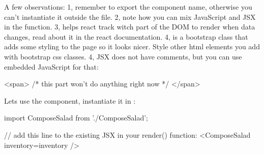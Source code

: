 \documentclass[fleqn, article, a4paper]{memoir}
\begin{document}
\begin{Assignments}
\noindent A few observations: 1, remember to export the component name, otherwise you can't instantiate it outside the file. 2, note how you can mix JavaScript and JSX in the  function. 3,  helps react track witch part of the DOM to render when data changes, read about it in the react documentation. 4,  is a bootstrap class that adds some styling to the page so it looks nicer. Style other html elements you add with bootstrap css classes. 4, JSX does not have comments, but you can use embedded JavaScript for that:
\begin{Code}
<span>
  {/* this part won't do anything right now */}
</span>
\end{Code}

\item Lets use the component, instantiate it in :
\begin{Code}
import ComposeSalad from './ComposeSalad';

// add this line to the existing JSX in your render() function:
<ComposeSalad inventory={inventory} />
\end{Code}


\end{Assignments}
\end{document}
